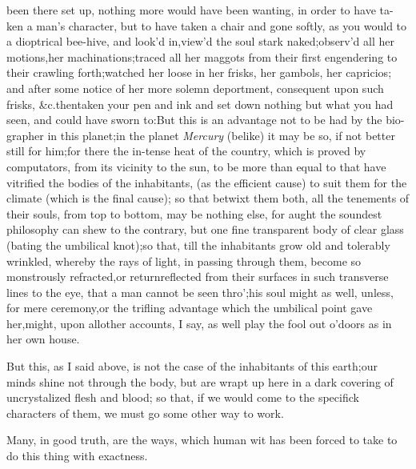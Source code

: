 \documentclass{article}
\begin{document}
\noindent
{}
been there set up,
nothing more would have been wanting, in order to have ta-\pb ken a
man’s character, but to have taken a chair and gone softly,
as you would to a dioptrical bee-hive, and look’d
in,\tsk\break view’d the soul stark naked;\tsk  observ’d all her
motions,\tsk  her machinations;\tsk\break  traced all her maggots from
their first engendering to their crawling forth;\tsk\break  watched her
loose in her frisks, her gambols, her capricios; and after some
notice of her more solemn deportment, consequent upon such frisks,
\&c.\tsh  then\break taken your pen and ink and set down
nothing but what you had seen, and\break
could have sworn to:\tsk  But this is an\break
advantage not to be had by the bio-\break
grapher in this
planet;\tsk  in the planet \textit{Mercury} (belike) it may be so, if not\break
better still for him;\tsh  for there the in-\break tense heat of the country, which is
pro\-ved by computators,
from its vicinity to the sun, to be more than equal to that\pb
{}
have vitrified the
bodies of the inhabitants, (as the efficient cause) to suit them
for the climate (which is the final cause); so that betwixt them
both, all the tenements of their souls, from top to bottom, may
be nothing else, for aught the soundest philosophy can shew to
the contrary, but one fine transparent body of clear glass
(bating the umbilical knot);\tsk\break  so that, till the inhabitants
grow old and tolerably wrinkled, whereby the rays of light, in
passing through them, become so monstrously refracted,\tsh  or
return\break reflected from their surfaces in such\break
transverse lines to
the eye, that a man cannot be seen thro’;\tsk  his soul might
as well, unless, for mere ceremony,\tsk or the trifling advantage
which the umbilical point gave her,\tsk  might, upon all\pb other
accounts, I say, as well play the fool out o’doors as in her own
house.

But this, as I said above, is not the case of the inhabitants of
this earth;\tsk  our minds shine not through the body, but are wrapt
up here in a dark covering of uncrystalized flesh and blood; so
that, if we would come to the specifick characters of them, we must
go some other way to work.

Many, in good truth, are the ways, which human wit has been
forced to take to do this thing with exactness.
\end{document}
